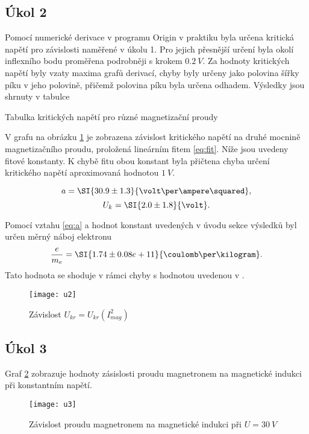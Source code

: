 \documentclass{protokol}
\begin{document}
    \subsection*{Úkol 2} 

      Pomocí numerické derivace v programu Origin v praktiku byla určena kritická napětí pro závislosti naměřené v úkolu 1. Pro jejich přesnější určení byla okolí inflexního bodu proměřena podrobněji s krokem $\SI{0.2}{V}$. Za hodnoty kritických napětí byly vzaty maxima grafů derivací, chyby byly určeny jako polovina šířky píku v jeho polovině, přičemž polovina píku byla určena odhadem. Výsledky jsou shrnuty v tabulce

      \begin{table}[H]
        \centering
        \setlength{\tabcolsep}{10pt}
        
        \caption{Tabulka kritických napětí pro různé magnetizační proudy}
        \label{tab:u2}
      \end{table}

      V grafu na obrázku \ref{fig:u2} je zobrazena závislost kritického napětí na druhé mocnině magnetizačního proudu, proložená lineárním fitem \eqref{eq:fit}. Níže jsou uvedeny fitové konstanty. K chybě fitu obou konstant byla přičtena chyba určení kritického napětí aproximovaná hodnotou $\SI{1}{V}$.
      
      $$ a = \SI{30.9 \pm 1.3}{\volt\per\ampere\squared}, $$
      $$ U_k = \SI{2.0 \pm 1.8}{\volt}. $$

      Pomocí vztahu \eqref{eq:a} a hodnot konstant uvedených v úvodu sekce výsledků byl určen měrný náboj elektronu 
      $$ \frac{ e }{ m_e } = \SI{1.74 \pm 0.08 e+11}{\coulomb\per\kilogram}. $$ 
      Tato hodnota se shoduje v rámci chyby s hodnotou uvedenou v \cite{pokyny}.

      \begin{figure}[H]
        \centering
        \texttt{[image: u2]}
        \caption{Závislost $U_{kr} = U_{kr}(I_{mag}^2)$}
        \label{fig:u2}
      \end{figure}

    \subsection*{Úkol 3}

      Graf \ref{fig:u3} zobrazuje hodnoty zásislosti proudu magnetronem na magnetické indukci při konstantním napětí.

      \begin{figure}[H]
        \centering
        \texttt{[image: u3]}
        \caption{Závislost proudu magnetronem na magnetické indukci při $U = \SI{30}{V}$}
        \label{fig:u3}
      \end{figure}
\end{document}
